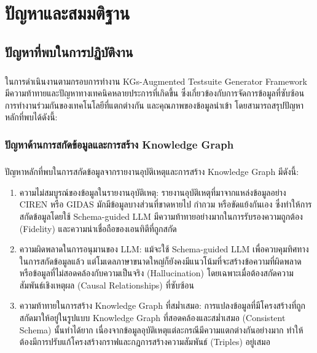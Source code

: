 \chapter{ปัญหาและสมมติฐาน}\label{ch:problems-hypotheses}

\section{ปัญหาที่พบในการปฏิบัติงาน}\label{sec:problems}
\paragraph{}

ในการดำเนินงานตามกรอบการทำงาน KGs-Augmented Testsuite Generator Framework มีความท้าทายและปัญหาทางเทคนิคหลายประการที่เกิดขึ้น ซึ่งเกี่ยวข้องกับการจัดการข้อมูลที่ซับซ้อน การทำงานร่วมกันของเทคโนโลยีที่แตกต่างกัน และคุณภาพของข้อมูลนำเข้า โดยสามารถสรุปปัญหาหลักที่พบได้ดังนี้:

\subsection{ปัญหาด้านการสกัดข้อมูลและการสร้าง Knowledge Graph}\label{subsec:data-extraction-kg}

\paragraph{} ปัญหาหลักที่พบในการสกัดข้อมูลจากรายงานอุบัติเหตุและการสร้าง Knowledge Graph มีดังนี้:

\begin{enumerate}[label=\arabic*.)]
    \item ความไม่สมบูรณ์ของข้อมูลในรายงานอุบัติเหตุ: รายงานอุบัติเหตุที่มาจากแหล่งข้อมูลอย่าง CIREN หรือ GIDAS มักมีข้อมูลบางส่วนที่ขาดหายไป กำกวม หรือขัดแย้งกันเอง ซึ่งทำให้การสกัดข้อมูลโดยใช้ Schema-guided LLM มีความท้าทายอย่างมากในการรับรองความถูกต้อง (Fidelity) และความน่าเชื่อถือของเอนทิตีที่ถูกสกัด
    \item ความผิดพลาดในการอนุมานของ LLM: แม้จะใช้ Schema-guided LLM เพื่อควบคุมทิศทางในการสกัดข้อมูลแล้ว แต่โมเดลภาษาขนาดใหญ่ก็ยังคงมีแนวโน้มที่จะสร้างข้อความที่ผิดพลาดหรือข้อมูลที่ไม่สอดคล้องกับความเป็นจริง (Hallucination) โดยเฉพาะเมื่อต้องสกัดความสัมพันธ์เชิงเหตุผล (Causal Relationships) ที่ซับซ้อน
    \item ความท้าทายในการสร้าง Knowledge Graph ที่สม่ำเสมอ: การแปลงข้อมูลที่มีโครงสร้างที่ถูกสกัดมาให้อยู่ในรูปแบบ Knowledge Graph ที่สอดคล้องและสม่ำเสมอ (Consistent Schema) นั้นทำได้ยาก เนื่องจากข้อมูลอุบัติเหตุแต่ละกรณีมีความแตกต่างกันอย่างมาก ทำให้ต้องมีการปรับแก้โครงสร้างกราฟและกฎการสร้างความสัมพันธ์ (Triples) อยู่เสมอ
\end{enumerate}

